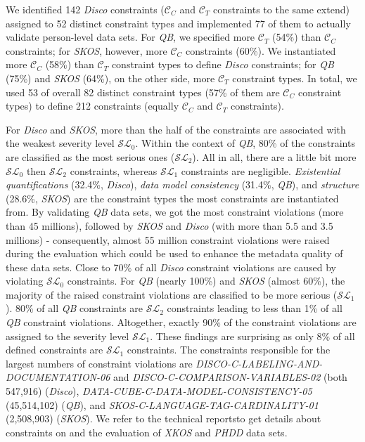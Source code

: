 \documentclass{llncs}
\newcommand{\tb}[1]{\todo[size=\small, color=green!40]{\textbf{Thomas:} #1}}
\begin{document}
{{We identified 142 \emph{Disco} constraints ($\mathcal{C}_{C}$ and $\mathcal{C}_{T}$ constraints to the same extend) assigned to 52 distinct constraint types and implemented 77 of them to actually validate person-level data sets.  
For \emph{QB}, we specified more $\mathcal{C}_{T}$ (54\%) than $\mathcal{C}_{C}$ constraints; for \emph{SKOS}, however, more $\mathcal{C}_{C}$ constraints (60\%).
We instantiated more $\mathcal{C}_{C}$ (58\%) than $\mathcal{C}_{T}$ constraint types to define \emph{Disco} constraints; 
for \emph{QB} (75\%) and \emph{SKOS} (64\%), on the other side, more $\mathcal{C}_{T}$ constraint types. 
In total, we used 53 of overall 82 distinct constraint types (57\% of them are $\mathcal{C}_{C}$ constraint types) to define 212 constraints (equally $\mathcal{C}_{C}$ and $\mathcal{C}_{T}$ constraints).

For \emph{Disco} and \emph{SKOS}, more than the half of the constraints are associated with the weakest severity level $\mathcal{SL}_{0}$.
Within the context of \emph{QB}, 80\% of the constraints are classified as the most serious ones ($\mathcal{SL}_{2}$).
All in all, there are a little bit more $\mathcal{SL}_{0}$ then $\mathcal{SL}_{2}$ constraints, whereas $\mathcal{SL}_{1}$ constraints are negligible.
\emph{Existential quantifications} (32.4\%, \emph{Disco}), \emph{data model consistency} (31.4\%, \emph{QB}), and \emph{structure} (28.6\%, \emph{SKOS}) are the constraint types the most constraints are instantiated from.
By validating \emph{QB} data sets, we got the most constraint violations (more than 45 millions), followed by \emph{SKOS} and \emph{Disco} (with more than 5.5 and 3.5 millions) - consequently, almost 55 million constraint violations were raised during the evaluation which could be used to enhance the metadata quality of these data sets.  
Close to 70\% of all \emph{Disco} constraint violations are caused by violating $\mathcal{SL}_{0}$ constraints.
For \emph{QB} (nearly 100\%) and \emph{SKOS} (almost 60\%), the majority of the raised constraint violations are classified to be more serious ($\mathcal{SL}_{1}$).
80\% of all \emph{QB} constraints are $\mathcal{SL}_{2}$ constraints leading to less than 1\% of all \emph{QB} constraint violations.
Altogether, exactly 90\% of the constraint violations are assigned to the severity level $\mathcal{SL}_{1}$.
These findings are surprising as only 8\% of all defined constraints are $\mathcal{SL}_{1}$ constraints.
The constraints responsible for the largest numbers of constraint violations are \emph{DISCO-C-LABELING-AND-DOCUMENTATION-06} and \emph{DISCO-C-COMPARISON-VARIABLES-02} (both 547,916) (\emph{Disco}), \emph{DATA-CUBE-C-DATA-MODEL-CONSISTENCY-05} (45,514,102) (\emph{QB}), and \emph{SKOS-C-LANGUAGE-TAG-CARDINALITY-01} (2,508,903) (\emph{SKOS})\tb{kurz beschreiben}.
We refer to the technical reports\footnotemark[\ref{technical-report-1}] \footnotemark[\ref{technical-report-2}] to get details about constraints on and the evaluation of \emph{XKOS} and \emph{PHDD} data sets.

}}
\end{document}

